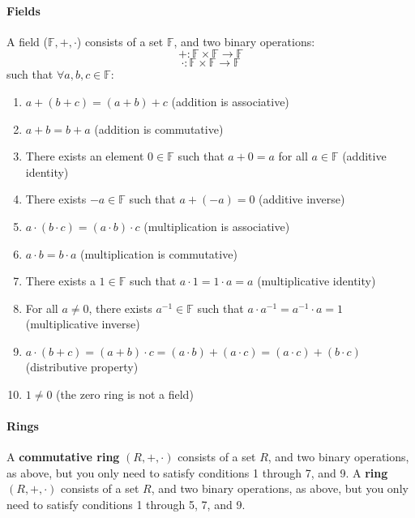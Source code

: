 \documentclass[10pt,letter]{article}
\theoremstyle{plain}
\theoremstyle{definition}
\begin{document}
\paragraph{Fields}
A field ($\mathbb{F},+,\cdot$) consists of a set $\mathbb{F}$, and two binary operations: $$+:\mathbb{F}\times\mathbb{F}\rightarrow\mathbb{F}$$ $$\cdot:\mathbb{F}\times\mathbb{F}\rightarrow\mathbb{F}$$ such that $\forall a,b,c\in\mathbb{F}$: 
\begin{enumerate}
    \item $a+(b+c)=(a+b)+c$ (addition is associative)
    \item $a+b=b+a$ (addition is commutative)
    \item There exists an element $0\in\mathbb{F}$ such that $a+0=a$ for all $a\in\mathbb{F}$ (additive identity)
    \item There exists $-a\in\mathbb{F}$ such that $a+(-a)=0$ (additive inverse)
    \item $a\cdot(b\cdot c)=(a\cdot b)\cdot c$ (multiplication is associative)
    \item $a\cdot b=b\cdot a$ (multiplication is commutative)  
    \item There exists a $1\in\mathbb{F}$ such that $a\cdot1=1\cdot a=a$ (multiplicative identity)
    \item For all $a\neq0$, there exists $a^{-1}\in\mathbb{F}$ such that $a\cdot a^{-1}=a^{-1}\cdot a=1$ (multiplicative inverse) 
    \item $a\cdot(b+c)=(a+b)\cdot c=(a\cdot b)+(a\cdot c)=(a\cdot c)+(b\cdot c)$ (distributive property) 
    \item $1\neq0$ (the zero ring is not a field)
\end{enumerate}

\paragraph{Rings}
A \textbf{commutative ring} $(R,+,\cdot)$ consists of a set $R$, and two binary operations, as above, but you only need to satisfy conditions 1 through 7, and 9. A \textbf{ring} $(R,+,\cdot)$ consists of a set $R$, and two binary operations, as above, but you only need to satisfy conditions 1 through 5, 7, and 9.
\end{document}
